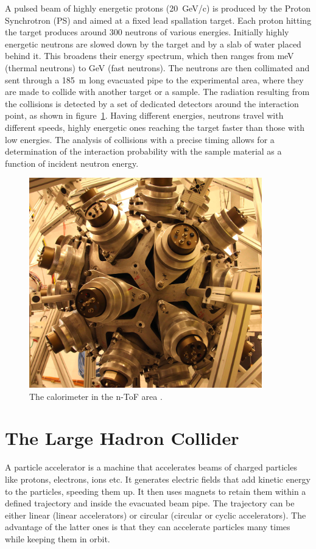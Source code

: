 \begin{description}
A pulsed beam of highly energetic protons (20~GeV/c) is produced by the Proton Synchrotron (PS) and aimed at a fixed lead spallation target. Each proton hitting the target produces around 300 neutrons of various energies. Initially highly energetic neutrons are slowed down by the target and by a slab of water placed behind it. This broadens their energy spectrum, which then ranges from meV (thermal neutrons) to GeV (fast neutrons). The neutrons are then collimated and sent through a 185~m long evacuated pipe to the experimental area, where they are made to collide with another target or a sample. The radiation resulting from the collisions is detected by a set of dedicated detectors around the interaction point, as shown in figure~\ref{fig:ntof}. Having different energies, neutrons travel with different speeds, highly energetic ones reaching the target faster than those with low energies. The analysis of collisions with a precise timing allows for a determination of the interaction probability with the sample material as a function of incident neutron energy.
\begin{figure}[!t]
\centering
\includegraphics[width=0.9\textwidth]{01_introduction/pics/ntof}
\caption{The calorimeter in the n-ToF area \cite{Maximilien:1304589}.}
\label{fig:ntof}
\end{figure}

\end{description}





\section{The Large Hadron Collider}
\label{subsec:lhc}
A particle accelerator is a machine that accelerates beams of charged particles like protons, electrons, ions etc. It generates electric fields that add kinetic energy to the particles, speeding them up. It then uses magnets to retain them within a defined trajectory and inside the evacuated beam pipe. The trajectory can be either linear (linear accelerators) or circular (circular or cyclic accelerators). The advantage of the latter ones is that they can accelerate particles many times while keeping them in orbit.

